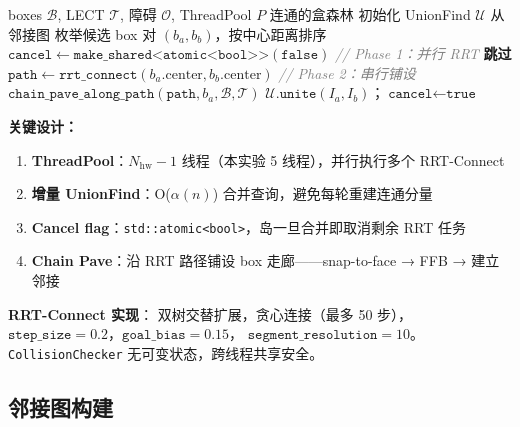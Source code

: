 \documentclass[11pt,a4paper]{article}
\begin{document}
\begin{algorithm}[t]
\caption{\texttt{bridge\_all\_islands} — 并行 RRT 桥接}
\label{alg:bridge}
\begin{algorithmic}[1]
\Require boxes $\mathcal{B}$, LECT $\mathcal{T}$, 障碍 $\mathcal{O}$, ThreadPool $P$
\Ensure 连通的盒森林
\State 初始化 UnionFind $\mathcal{U}$ 从邻接图
    \State 枚举候选 box 对 $(b_a, b_b)$，按中心距离排序
    \State $\texttt{cancel} \leftarrow \texttt{make\_shared<atomic<bool>>}(\texttt{false})$
    \Statex \hspace{1.2em}\textcolor{gray}{\textit{// Phase 1：并行 RRT}}
       \textbf{跳过} \EndIf
      \State $\texttt{path} \leftarrow \texttt{rrt\_connect}(b_a.\mathrm{center}, b_b.\mathrm{center})$
    \EndFor
    \Statex \hspace{1.2em}\textcolor{gray}{\textit{// Phase 2：串行铺设}}
      \State $\texttt{chain\_pave\_along\_path}(\texttt{path}, b_a, \mathcal{B}, \mathcal{T})$
      \State $\mathcal{U}.\texttt{unite}(I_a, I_b)$；$\texttt{cancel} \leftarrow \texttt{true}$
    \EndFor
  \EndFor
\EndWhile
\end{algorithmic}
\end{algorithm}

\textbf{关键设计：}

\begin{enumerate}[nosep]
  \item \textbf{ThreadPool}：$N_{\mathrm{hw}} - 1$ 线程（本实验 5 线程），并行执行多个 RRT-Connect
  \item \textbf{增量 UnionFind}：O($\alpha(n)$) 合并查询，避免每轮重建连通分量
  \item \textbf{Cancel flag}：\texttt{std::atomic<bool>}，岛一旦合并即取消剩余 RRT 任务
  \item \textbf{Chain Pave}：沿 RRT 路径铺设 box 走廊——snap-to-face → FFB → 建立邻接
\end{enumerate}

\textbf{RRT-Connect 实现}：
双树交替扩展，贪心连接（最多 50 步），
$\texttt{step\_size} = 0.2$，$\texttt{goal\_bias} = 0.15$，
$\texttt{segment\_resolution} = 10$。
\texttt{CollisionChecker} 无可变状态，跨线程共享安全。

\subsection{邻接图构建}
\end{document}
